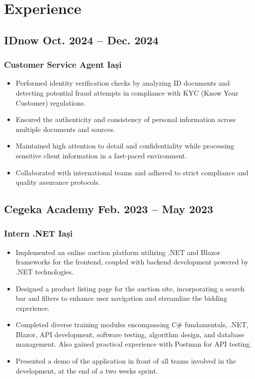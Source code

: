 \documentclass[11pt]{article}
\begin{document}
\section{Experience}
\subsection{IDnow \hfill Oct. 2024 -- Dec. 2024}
\subsubsection{ Customer Service Agent \hfill Iași}
\begin{itemize}
    \item Performed identity verification checks by analyzing ID documents and detecting potential fraud attempts in compliance with KYC (Know Your Customer) regulations.   
    \item   Ensured the authenticity and consistency of personal information across multiple documents and sources.
    \item Maintained high attention to detail and confidentiality while processing sensitive client information in a fast-paced environment.  
    \item Collaborated with international teams and adhered to strict compliance and quality assurance protocols. 
\end{itemize}
\subsection{Cegeka Academy \hfill Feb. 2023 -- May 2023}
\subsubsection{ Intern .NET \hfill Iași}
\begin{itemize}
    \item  Implemented an online auction platform utilizing .NET and Blazor frameworks for the frontend, coupled with backend development powered by .NET technologies.   
    \item Designed a product listing page for the auction site, incorporating a search bar and filters to enhance user navigation and streamline the bidding experience.
    \item Completed diverse training modules encompassing C\# fundamentals, .NET, Blazor, API development, software testing, algorithm design, and database management. Also gained practical experience with Postman for API testing.  
    \item Presented a demo of the application in front of all teams involved in the development, at the end of a two weeks sprint. 
\end{itemize}
\end{document}
